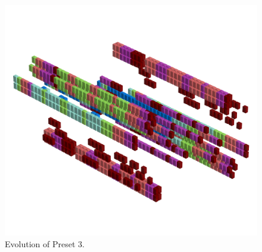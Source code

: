 \begin{figure}[H]                                                          
  \centering                                                             
  \begin{adjustbox}{width=14cm,center}                                   
  \includegraphics[width=14cm]{src/presets/pattern3-45.png}%
  \end{adjustbox}                                                        
\caption{Evolution of Preset 3.}                                           
\end{figure}                                                               
\clearpage                                                                 
                                                                           

